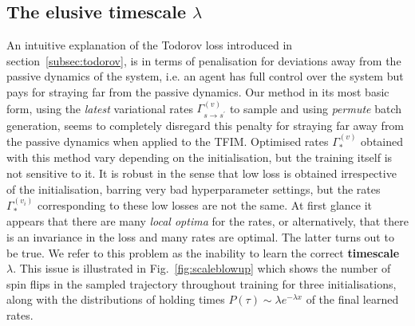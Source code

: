\subsection{The elusive timescale $\lambda$}
\label{subsec:elusive_lambda}
An intuitive explanation of the Todorov loss introduced in section~\ref{subsec:todorov}, is in terms of penalisation for deviations away from the passive dynamics of the system, i.e. an agent has full control over the system but pays for straying far from the passive dynamics. Our method in its most basic form, using the \emph{latest} variational rates $\Gamma^{(v)}_{s \rightarrow s^\prime}$ to sample and using \emph{permute} batch generation, seems to completely disregard this penalty for straying far away from the passive dynamics when applied to the TFIM. Optimised rates $\Gamma_*^{(v)}$ obtained with this method vary depending on the initialisation, but the training itself is not sensitive to it. It is robust in the sense that low loss is obtained irrespective of the initialisation, barring very bad hyperparameter settings, but the rates $\Gamma_*^{(v_i)}$ corresponding to these low losses are not the same. At first glance it appears that there are many \emph{local optima} for the rates, or alternatively, that there is an invariance in the loss and many rates are optimal. The latter turns out to be true. We refer to this problem as the inability to learn the correct \textbf{timescale} $\lambda$. This issue is illustrated in Fig.~\ref{fig:scaleblowup} which shows the number of spin flips in the sampled trajectory throughout training for three initialisations, along with the distributions of holding times $P(\tau) \sim \lambda e^{-\lambda x}$ of the final learned rates.

